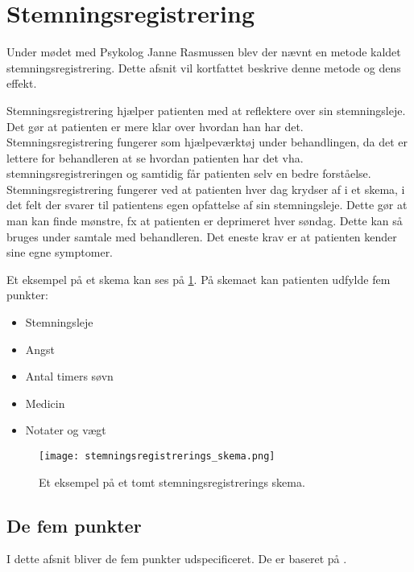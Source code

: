 \section{Stemningsregistrering}\label{stemningsleje::stemningsregistrering}
Under mødet med Psykolog Janne Rasmussen\cite[Afsnit 1.3, Møde med Psykolog Janne Rasmussen]{faelles} blev der nævnt en metode kaldet stemningsregistrering.
Dette afsnit vil kortfattet beskrive denne metode og dens effekt.

Stemningsregistrering\cite[Appendiks F, Stemningsregistrering]{faelles} hjælper patienten med at reflektere over sin stemningsleje.
Det gør at patienten er mere klar over hvordan han har det.
Stemningsregistrering fungerer som hjælpeværktøj under behandlingen, da det er lettere for behandleren at se hvordan patienten har det vha. stemningsregistreringen og samtidig får patienten selv en bedre forståelse.
Stemningsregistrering fungerer ved at patienten hver dag krydser af i et skema, i det felt der svarer til patientens egen opfattelse af sin stemningsleje.
Dette gør at man kan finde mønstre, fx at patienten er deprimeret hver søndag.
Dette kan så bruges under samtale med behandleren.
Det eneste krav er at patienten kender sine egne symptomer.

Et eksempel på et skema kan ses på \cref{figure::stemningsregistrerings_skema}.
På skemaet kan patienten udfylde fem punkter:
\begin{itemize}
	\item Stemningsleje
	\item Angst
	\item Antal timers søvn
	\item Medicin
	\item Notater og vægt
\end{itemize}

\begin{figure}
	\texttt{[image: stemningsregistrerings\_skema.png]}
	\caption{Et eksempel på et tomt stemningsregistrerings skema.}
	\label{figure::stemningsregistrerings_skema}
\end{figure}

\subsection{De fem punkter}
I dette afsnit bliver de fem punkter udspecificeret.
De er baseret på \citet[Appendiks F, Stemningsregistrering]{faelles}.
